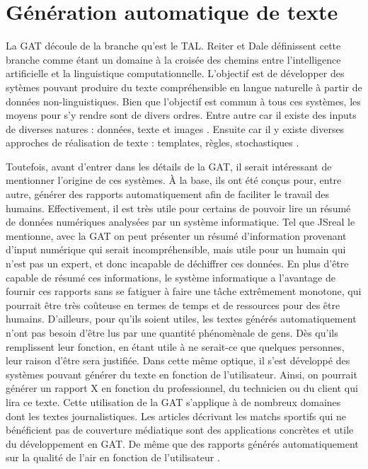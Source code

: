 
\chapter{Génération automatique de texte}


La \acf{GAT} découle de la branche qu'est le \acf{TAL}. Reiter et Dale \citep{ReiterBuildingNaturalLanguage2000} définissent cette branche comme étant un domaine à la croisée des chemins entre l'intelligence artificielle et la linguistique computationnelle. L'objectif est de développer des sytèmes pouvant produire du texte compréhensible en langue naturelle à partir de données non-linguistiques. Bien que l'objectif est commun à tous ces systèmes, les moyens pour s'y rendre sont de divers ordres. Entre autre car il existe des inputs de diverses natures : données, texte et images \citep{thomason:coling14}. Ensuite car il y existe diverses approches de réalisation de texte : templates, règles, stochastiques \citep{gatt18}.

Toutefois, avant d'entrer dans les détails de la \ac{GAT}, il serait intéressant de mentionner l'origine de ces systèmes. À la base, ils ont été conçus pour, entre autre, générer des rapports automatiquement afin de faciliter le travail des humains. Effectivement, il est très utile pour certains de pouvoir lire un résumé de données numériques analysées par un système informatique. Tel que JSreal le mentionne, avec la GAT on peut présenter un résumé d'information provenant d'input numérique qui serait incompréhensible, mais utile pour un humain qui n'est pas un expert, et donc incapable de déchiffrer ces données. En plus d'être capable de résumé ces informations, le système informatique a l'avantage de fournir ces rapports sans se fatiguer à faire une tâche extrêmement monotone, qui pourrait être très coûteuse en termes de temps et de ressources pour des être humains.  D'ailleurs, pour qu'ils soient utiles, les textes générés automatiquement n'ont pas besoin d'être lus par une quantité phénomènale de gens. Dès qu'ils remplissent leur fonction, en étant utile à ne serait-ce que quelques personnes, leur raison d'être sera justifiée.  Dans cette même optique, il s'est développé des systèmes pouvant générer du texte en fonction de l'utilisateur. Ainsi, on pourrait générer un rapport X en fonction du professionnel, du technicien ou du client \citep{1948c0b7a8ca42679cad977bb2cdddc2} qui lira ce texte. Cette utilisation de la \ac{GAT} s'applique à de nombreux domaines dont les textes journalistiques. Les articles décrivant les matchs sportifs qui ne bénéficient pas de couverture médiatique \citep{W17-3513} sont des applications concrètes et utile du développement en \ac{GAT}. De même que des rapports générés automatiquement sur la qualité de l'air en fonction de l'utilisateur \citep{WannerMARQUISGENERATIONUSERTAILORED2010}.

